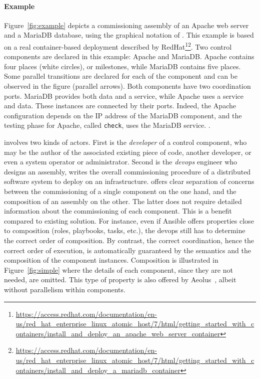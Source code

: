 \paragraph{Example}{
	Figure~\ref{fig:example} depicts a \mad commissioning assembly of an Apache 
	web server and a MariaDB database, using the graphical notation of \mad. 
	This example is based on a real container-based deployment described by 
	RedHat\footnote{\url{https://access.redhat.com/documentation/en-us/red_hat_enterprise_linux_atomic_host/7/html/getting_started_with_containers/install_and_deploy_an_apache_web_server_container}}\footnote{\url{https://access.redhat.com/documentation/en-us/red_hat_enterprise_linux_atomic_host/7/html/getting_started_with_containers/install_and_deploy_a_mariadb_container}}.
	 Two \mad control components are declared in this example: Apache and MariaDB. 
	Apache contains four places (white circles), or milestones, while MariaDB 
	contains five places. Some parallel transitions are declared for each of the 
	component and can be observed in the figure (parallel arrows). Both components 
	have two coordination ports. MariaDB provides both data and a service, while 
	Apache uses a service and data. These instances are connected by their ports. 
	Indeed, the Apache configuration depends on the IP address of the MariaDB 
	component, and the testing phase for Apache, called \texttt{check}, uses the 
	MariaDB service. .
} %

\mad involves two kinds of actors. First is the \emph{developer} of a
control component, who may be the author of the associated existing
piece of code, another developer, or even a system operator or
administrator. Second is the \emph{devops} engineer who designs an
assembly, \ie writes the overall commissioning procedure of a
distributed software system to deploy on an infrastructure. \mad
offers clear separation of concerns between the commissioning of a
single component on the one hand, and the composition of an assembly
on the other. The latter does not require detailed information about
the commissioning of each component. This is a benefit compared to
existing solution. For instance, even if Ansible offers properties
close to composition (\eg roles, playbooks, tasks, etc.), the devops
still has to determine the correct order of composition. By contrast,
the correct coordination, hence the correct order of execution, is
automatically guaranteed by the \mad semantics and the composition of
the component instances. Composition is illustrated in
Figure~\ref{fig:simple} where the details of each component, since
they are not needed, are omitted. This type of property is also
offered by Aeolus~\cite{dicosmo2014ic}, albeit without parallelism
within components.

